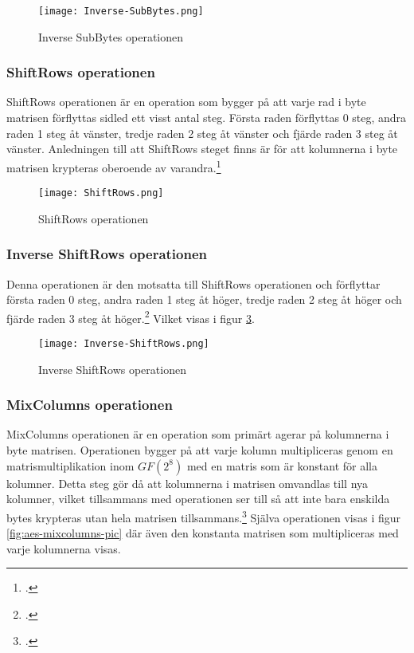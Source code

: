 \begin{figure}[H]
    \centering
    \texttt{[image: Inverse-SubBytes.png]}
    \caption{Inverse SubBytes operationen}
    \label{fig:aes-inverse-subbytes-pic}
\end{figure}

\subsubsection{ShiftRows operationen}
\label{sec:aes-shiftrows}

ShiftRows operationen är en operation som bygger på att varje rad i \gls{byte} matrisen förflyttas sidled ett visst antal steg.
Första raden förflyttas 0 steg, andra raden 1 steg åt vänster, tredje raden 2 steg åt vänster och fjärde raden 3 steg åt vänster. Anledningen till att ShiftRows steget
finns är för att kolumnerna i \gls{byte} matrisen krypteras oberoende av varandra.\footcite{daemen1999aes}

\begin{figure}[H]
    \centering
    \texttt{[image: ShiftRows.png]}
    \caption{ShiftRows operationen}
    \label{fig:aes-shiftrows-pic}
\end{figure}

\subsubsection{Inverse ShiftRows operationen}
\label{sec:aes-invers-shiftrows}

Denna operationen är den motsatta till ShiftRows operationen och förflyttar
första raden 0 steg, andra raden 1 steg åt höger, tredje raden 2 steg åt höger och fjärde raden 3 steg åt höger.\footcite{daemen1999aes}
Vilket visas i figur \ref{fig:aes-inverse-shiftrows-pic}.

\begin{figure}[H]
    \centering
    \texttt{[image: Inverse-ShiftRows.png]}
    \caption{Inverse ShiftRows operationen}
    \label{fig:aes-inverse-shiftrows-pic}
\end{figure}

\subsubsection{MixColumns operationen}
\label{sec:aes-mixcolumns}

MixColumns operationen är en operation som primärt agerar på kolumnerna i \gls{byte} matrisen. Operationen bygger på att varje kolumn multipliceras genom en
\gls{matrismultiplikation} inom \hyperref[sec:finite-fields]{$GF(2^8)$} med en matris som är konstant för alla kolumner. Detta steg gör då att kolumnerna i matrisen omvandlas till nya kolumner,
vilket tillsammans med  operationen ser till så att inte bara enskilda bytes krypteras utan hela matrisen tillsammans.\footcite{daemen1999aes} Själva operationen visas i figur \ref{fig:aes-mixcolumns-pic}
där även den konstanta matrisen som multipliceras med varje kolumnerna visas.

